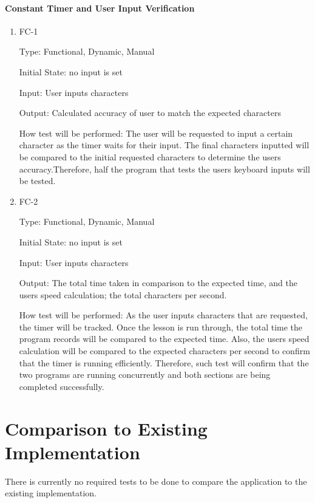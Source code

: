 \documentclass[12pt, titlepage]{article}
\begin{document}
\paragraph{Constant Timer and User Input Verification}

\begin{enumerate}

\item{FC-1\\}

Type: Functional, Dynamic, Manual
					
Initial State: no input is set
					
Input: User inputs characters
					
Output: Calculated accuracy of user to match the expected characters
					
How test will be performed: The user will be requested to input a certain character as the timer waits for their input. The final characters inputted will be compared to the initial requested characters to determine the users accuracy.Therefore, half the program that tests the users keyboard inputs will be tested. 
					
\item{FC-2\\}

Type: Functional, Dynamic, Manual
					
Initial State: no input is set
					
Input: User inputs characters
					
Output: The total time taken in comparison to the expected time, and the users speed calculation; the total characters per second.
					
How test will be performed: As the user inputs characters that are requested, the timer will be tracked. Once the lesson is run through, the total time the program records will be compared to the expected time. Also, the users speed calculation will be compared to the expected characters per second to confirm that the timer is running efficiently. Therefore, such test will confirm that the two programs are running concurrently and both sections are being completed successfully.

\end{enumerate}

	
\section{Comparison to Existing Implementation}	
There is currently no required tests to be done to compare the application to the existing implementation.
				
\end{document}
